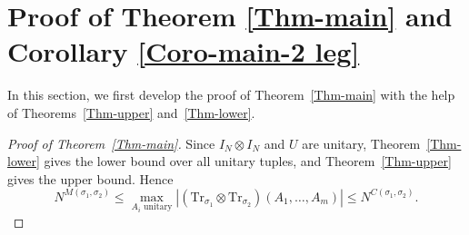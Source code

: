 \documentclass[10pt,a4paper]{amsart}
\numberwithin{equation}{section}
\theoremstyle{plain}
\def\Tr{\mathrm {Tr}}
\begin{document}
\section{Proof of Theorem \ref{Thm-main} and Corollary \ref{Coro-main-2 leg}} \label{sec:2legs}

In this section, we first develop the proof of Theorem~\ref{Thm-main} with the help of Theorems~\ref{Thm-upper} and~\ref{Thm-lower}.


\begin{proof}[Proof of Theorem~\ref{Thm-main}]
Since $I_N\otimes I_N$ and $U$ are unitary, Theorem~\ref{Thm-lower} gives the lower bound over all unitary tuples, and Theorem~\ref{Thm-upper} gives the upper bound. Hence
\begin{equation}
N^{M(\sigma_1,\sigma_2)}
\le \max_{A_i\text{ unitary}}|(\Tr_{\sigma_1}\otimes\Tr_{\sigma_2})(A_1,\ldots,A_m)|
\le N^{C(\sigma_1,\sigma_2)}.
\end{equation}
\end{proof}
\end{document}

